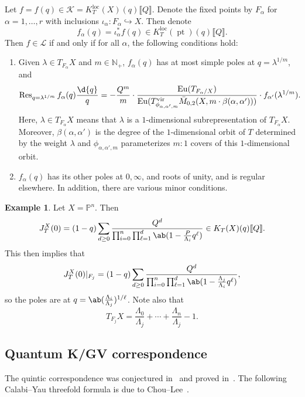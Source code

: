 \documentclass{amsart}
\theoremstyle{definition}
\newtheorem{exm}[thm]{Example}
\theoremstyle{remark}
\theoremstyle{plain}
\theoremstyle{definition}
\theoremstyle{remark}
\newcommand{\N}{\mathbb{N}}
\renewcommand{\P}{\mathbb{P}}
\newcommand{\mc}[1]{\mathcal{#1}}
\newcommand{\mr}[1]{\mathrm{#1}}
\newcommand{\on}[1]{\operatorname{#1}}
\newcommand{\1}{\mathbf{1}}
\newcommand{\2}{\mathbf{2}}
\newcommand{\3}{\mathbf{3}}
\newcommand{\vir}{\mr{vir}}
\newcommand{\ps}[1]{\llbracket #1 \rrbracket}
\newcommand{\loc}{\mr{loc}}
\begin{document}
Let \(f = f(q) \in \mc{K} = K_T^{\loc}(X)(q)\ps{Q}\). Denote the fixed points by \(F_{\alpha}\) for \(\alpha = 1, \ldots, r\) with inclusions \(\iota_{\alpha} \colon F_{\alpha} \hookrightarrow X\). Then denote
\[ f_{\alpha}(q) = \iota_{\alpha}^* f(q) \in K_T^{\loc}(\on{pt})(q)\ps{Q}. \]
Then \(f \in \mc{L}\) if and only if for all \(\alpha\), the following conditions hold:
\begin{enumerate}
    \item Given \(\lambda \in T_{F_{\alpha}} X\) and \(m \in \N_+\), \(f_{\alpha}(q)\) has at most simple poles at \(q = \lambda^{1/m}\), and
        \[ \on{Res}_{q = \lambda^{1/m}} f_{\alpha}(q) \frac{\d{q}}{q} = -\frac{Q^m}{m} \cdot \frac{\on{Eu}(T_{F_{\alpha}/X})}{\on{Eu}(T^{\vir}_{\phi_{\alpha,\alpha',m}}\bar{M}_{0,2}(X, m \cdot \beta(\alpha, \alpha')))} \cdot f_{\alpha'}(\lambda^{1/m}). \]
        Here, \(\lambda \in T_{F_{\alpha}}X\) means that \(\lambda\) is a \(1\)-dimensional subrepresentation of \(T_{F_{\alpha}} X\). Moreover, \(\beta(\alpha,\alpha')\) is the degree of the \(1\)-dimensional orbit of \(T\) determined by the weight \(\lambda\) and \(\phi_{\alpha, \alpha', m}\) parameterizes \(m:1\) covers of this \(1\)-dimensional orbit.
    \item \(f_{\alpha}(q)\) has its other poles at \(0, \infty\), and roots of unity, and is regular elsewhere. In addition, there are various minor conditions.
\end{enumerate}

\begin{exm}
    Let \(X = \P^n\). Then
    \[ J_T^X(0) = (1-q) \sum_{d \geq 0} \frac{Q^d}{\prod_{i=0}^n \prod_{\ell = 1}^d \ab(1 - \frac{P}{\Lambda_i} q^{\ell})} \in K_T(X)(q) \ps{Q}. \]
    This then implies that 
    \[ J_T^X(0) |_{F_j} = (1-q) \sum_{d \geq 0} \frac{Q^d}{\prod_{i=0}^n \prod_{\ell = 1}^d \ab(1 - \frac{\Lambda_j}{\Lambda_i}q^{\ell})}, \]
    so the poles are at \(q = \ab(\frac{\Lambda_i}{\Lambda_j})^{1/\ell}\). Note also that
    \[ T_{F_j} X = \frac{\Lambda_0}{\Lambda_j} + \cdots + \frac{\Lambda_n}{\Lambda_j} - 1. \]
\end{exm}

\subsection{Quantum K/GV correspondence}%
\label{sub:Quantum K/GV correspondence}

The quintic correspondence was conjectured in~\cite{GaroufalidisScheidegger2022} and proved in~\cite{ChouLeeQuintic}. The following Calabi--Yau threefold formula is due to Chou--Lee~\cite{ChouLee2025}.
\end{document}
